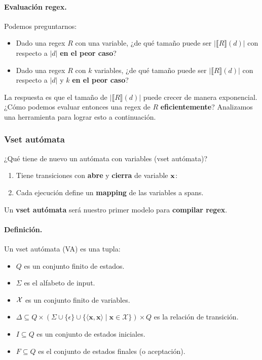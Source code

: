 \paragraph{Evaluación regex.} Podemos preguntarnos:

\begin{itemize}
    \item Dado una regex $R$ con una variable, ¿de qué tamaño puede ser $|\llbracket R \rrbracket(d)|$ con respecto a $|d|$ \textbf{en el peor caso}?
    \item Dado una regex $R$ con $k$ variables, ¿de qué tamaño puede ser $|\llbracket R \rrbracket(d)|$ con respecto a $|d|$ y $k$ \textbf{en el peor caso}?
\end{itemize}

La respuesta es que el tamaño de $|\llbracket R \rrbracket(d)|$ puede crecer de manera exponencial. ¿Cómo podemos evaluar entonces una regex de $R$ \textbf{eficientemente}? Analizamos una herramienta para lograr esto a continuación.

\subsubsection{Vset autómata}

¿Qué tiene de nuevo un autómata con variables (vset autómata)?
\begin{enumerate}
    \item Tiene transiciones con \textbf{abre} y \textbf{cierra} de variable $\mathbf{x}$:
    \item Cada ejecución define un \textbf{mapping} de las variables a spans.
\end{enumerate}
Un \textbf{vset autómata} será nuestro primer modelo para \textbf{compilar regex}.

\paragraph{Definición.} Un vset autómata (VA) es una tupla:
\begin{itemize}
    \item $Q$ es un conjunto finito de estados.
    \item $\Sigma$ es el alfabeto de input.
    \item $\mathcal{X}$ es un conjunto finito de variables.
    \item $\Delta \subseteq Q \times(\Sigma \cup\{\epsilon\} \cup\{\langle\mathbf{x}, \mathbf{x}\rangle \mid \mathbf{x} \in \mathcal{X}\}) \times Q$ es la relación de transición.
    \item $I \subseteq Q$ es un conjunto de estados iniciales.
    \item $F \subseteq Q$ es el conjunto de estados finales (o aceptación).
\end{itemize}

